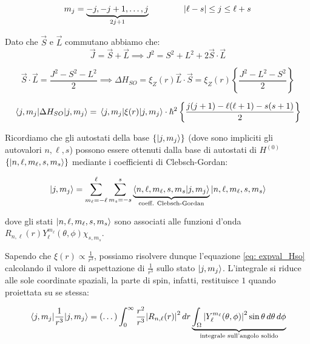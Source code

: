 \begin{equation}
    m_j = \underbrace{-j, -j+1, \dots, j}_{2j+1} \qquad \qquad \abs{\ell - s} \le j \le \ell + s
\end{equation}

Dato che \(\vec{S} \) e \( \vec{L}\) commutano abbiamo che:
\begin{equation}
    \vec{J} = \vec{S} + \vec{L} \implies J^2 = S^2 + L^2 + 2 \vec{S} \cdot \vec{L} 
\end{equation}

\begin{equation}
    \vec{S} \cdot \vec{L} = \frac{J^2 - S^2 - L^2}{2}
    \implies \Delta H_{SO} = \xi_Z(r) \vec{L} \cdot \vec{S} = \xi_Z(r) \left\{ \frac{J^2 - L^2 - S^2}{2} \right\} 
\end{equation}

\begin{equation}
    \label{eq: expval_Hso}
    \mel{j, m_j}{\Delta H_{SO}}{j, m_j} = \mel{j, m_j}{\xi(r)}{j, m_j} \cdot \hbar^2 \left\{ \frac{j(j+1) - \ell(\ell+1) - s(s+1)}{2} \right\}
\end{equation}


Ricordiamo che gli autostati della base \(\left\{ \ket{j,m_j} \right\}\) (dove sono impliciti gli autovalori \(n, \ell, s\))
possono essere ottenuti dalla base di autostati di \(H^{(0)}\) \(\left\{ \ket{n, \ell, m_{\ell}, s, m_s} \right\}\) mediante i coefficienti di Clebsch-Gordan:

\begin{equation}
    \ket{j, m_j} = \sum_{m_{\ell}=-\ell}^{\ell} \sum_{m_s=-s}^{s} \underbrace{\braket{n, \ell, m_{\ell}, s, m_s}{j, m_j}}_{\text{coeff. Clebsch-Gordan}} \ket{n, \ell, m_{\ell}, s, m_s}
\end{equation}

dove gli stati \(\ket{n, \ell, m_{\ell}, s, m_s}\) sono associati alle funzioni d'onda \( R_{n,\ell}(r) Y_{\ell}^{m_{\ell}}(\theta,\phi) \chi_{s,m_s}\).

Sapendo che \(\xi(r) \propto \frac{1}{r^3}\), possiamo risolvere dunque l'equazione \ref{eq: expval_Hso} 
calcolando il valore di aspettazione di \(\frac{1}{r^3}\) sullo stato \(\ket{j, m_j}\). 
L'integrale si riduce alle sole coordinate spaziali, la parte di spin, infatti, restituisce \(1\) quando proiettata su se stessa:

\begin{equation}
    \mel{j, m_j}{\frac{1}{r^3}}{j, m_j} = (\dots) \int_0^\infty \frac{r^2}{r^3} \abs{R_{n,\ell}(r)}^2 \, dr \underbrace{\int_{\Omega} \abs{Y_{\ell}^{m_{\ell}}(\theta,\phi)}^2 \sin\theta \, d\theta \, d\phi}_{\text{integrale sull'angolo solido}}
\end{equation}

